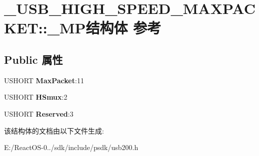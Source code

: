 \hypertarget{struct___u_s_b___h_i_g_h___s_p_e_e_d___m_a_x_p_a_c_k_e_t_1_1___m_p}{}\section{\+\_\+\+U\+S\+B\+\_\+\+H\+I\+G\+H\+\_\+\+S\+P\+E\+E\+D\+\_\+\+M\+A\+X\+P\+A\+C\+K\+ET\+:\+:\+\_\+\+M\+P结构体 参考}
\label{struct___u_s_b___h_i_g_h___s_p_e_e_d___m_a_x_p_a_c_k_e_t_1_1___m_p}
\subsection*{Public 属性}
\begin{DoxyCompactItemize}
\item 
\mbox{\label{struct___u_s_b___h_i_g_h___s_p_e_e_d___m_a_x_p_a_c_k_e_t_1_1___m_p_a8c0d0763712a6742e911bcd3f3b5807b}} 
U\+S\+H\+O\+RT {\bfseries Max\+Packet}\+:11
\item 
\mbox{\label{struct___u_s_b___h_i_g_h___s_p_e_e_d___m_a_x_p_a_c_k_e_t_1_1___m_p_acb231836e494c861c1d0d17b4e51ec2a}} 
U\+S\+H\+O\+RT {\bfseries H\+Smux}\+:2
\item 
\mbox{\label{struct___u_s_b___h_i_g_h___s_p_e_e_d___m_a_x_p_a_c_k_e_t_1_1___m_p_a1779885df4f1777d8b74e2d00737af9a}} 
U\+S\+H\+O\+RT {\bfseries Reserved}\+:3
\end{DoxyCompactItemize}


该结构体的文档由以下文件生成\+:\begin{DoxyCompactItemize}
\item 
E\+:/\+React\+O\+S-\/0../sdk/include/psdk/usb200.\+h\end{DoxyCompactItemize}
